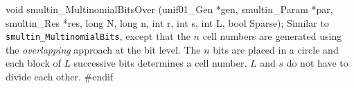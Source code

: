 void smultin_MultinomialBitsOver (unif01_Gen *gen, smultin_Param *par,
   smultin_Res *res, long N, long n, int r, int s, int L, bool Sparse);
\endcode
 \tab
  Similar to {\tt smultin\_MultinomialBits}, except that the $n$ cell
  numbers are generated using the {\em overlapping\/} approach at the
  bit level.  The $n$ bits are placed in a circle and each block of $L$
  successive bits determines a cell number.
  $L$ and $s$ do not have to divide each other.
 \endtab
\code
\hide
#endif
\endhide
\endcode
